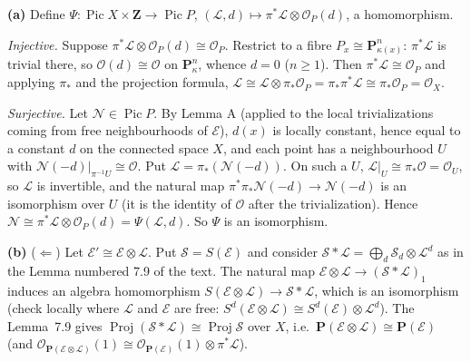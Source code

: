 \documentclass[11pt]{article}
\begin{document}
\textbf{(a)} Define $\Psi:\operatorname{Pic}X\times\mathbf Z\to\operatorname{Pic}P$, $(\mathcal L,d)\mapsto\pi^*\mathcal L\otimes\mathcal O_P(d)$, a homomorphism.

\emph{Injective.} Suppose $\pi^*\mathcal L\otimes\mathcal O_P(d)\cong\mathcal O_P$. Restrict to a fibre $P_x\cong\mathbf P^n_{\kappa(x)}$: $\pi^*\mathcal L$ is trivial there, so $\mathcal O(d)\cong\mathcal O$ on $\mathbf P^n_\kappa$, whence $d=0$ ($n\ge1$). Then $\pi^*\mathcal L\cong\mathcal O_P$ and applying $\pi_*$ and the projection formula, $\mathcal L\cong\mathcal L\otimes\pi_*\mathcal O_P=\pi_*\pi^*\mathcal L\cong\pi_*\mathcal O_P=\mathcal O_X$.

\emph{Surjective.} Let $\mathcal N\in\operatorname{Pic}P$. By Lemma A (applied to the local trivializations coming from free neighbourhoods of $\mathcal E$), $d(x)$ is locally constant, hence equal to a constant $d$ on the connected space $X$, and each point has a neighbourhood $U$ with $\mathcal N(-d)|_{\pi^{-1}U}\cong\mathcal O$. Put $\mathcal L=\pi_*(\mathcal N(-d))$. On such a $U$, $\mathcal L|_U\cong\pi_*\mathcal O=\mathcal O_U$, so $\mathcal L$ is invertible, and the natural map $\pi^*\pi_*\mathcal N(-d)\to\mathcal N(-d)$ is an isomorphism over $U$ (it is the identity of $\mathcal O$ after the trivialization). Hence $\mathcal N\cong\pi^*\mathcal L\otimes\mathcal O_P(d)=\Psi(\mathcal L,d)$. So $\Psi$ is an isomorphism.

\textbf{(b)} ($\Leftarrow$) Let $\mathcal E'\cong\mathcal E\otimes\mathcal L$. Put $\mathcal S=S(\mathcal E)$ and consider $\mathcal S*\mathcal L=\bigoplus_d\mathcal S_d\otimes\mathcal L^d$ as in the Lemma numbered 7.9 of the text. The natural map $\mathcal E\otimes\mathcal L\to(\mathcal S*\mathcal L)_1$ induces an algebra homomorphism $S(\mathcal E\otimes\mathcal L)\to\mathcal S*\mathcal L$, which is an isomorphism (check locally where $\mathcal L$ and $\mathcal E$ are free: $S^d(\mathcal E\otimes\mathcal L)\cong S^d(\mathcal E)\otimes\mathcal L^d$). The Lemma~7.9 gives $\operatorname{Proj}(\mathcal S*\mathcal L)\cong\operatorname{Proj}\mathcal S$ over $X$, i.e.\ $\mathbf P(\mathcal E\otimes\mathcal L)\cong\mathbf P(\mathcal E)$ (and $\mathcal O_{\mathbf P(\mathcal E\otimes\mathcal L)}(1)\cong\mathcal O_{\mathbf P(\mathcal E)}(1)\otimes\pi^*\mathcal L$).
\end{document}
